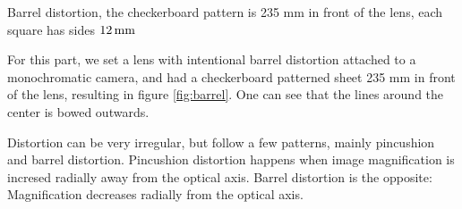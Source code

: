        {Barrel distortion, the checkerboard pattern is 235 mm in front of the
        lens, each square has sides $12 \, \textrm{mm}$}

For this part, we set a lens with intentional barrel distortion 
attached to a monochromatic camera, and had a checkerboard 
patterned sheet 235 mm in front of the lens, resulting in figure
\vref{fig:barrel}. One can see that the lines around the center is bowed
outwards.

Distortion can be very irregular, but follow a few patterns, mainly
pincushion and barrel distortion. Pincushion distortion happens when 
image magnification is incresed radially away from the optical axis. 
Barrel distortion is the opposite: Magnification decreases radially
from the optical axis. 
